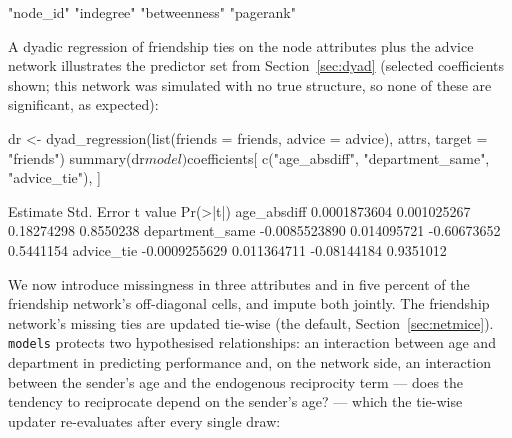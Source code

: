 \documentclass[11pt,a4paper]{article}
\newcommand{\code}[1]{\texttt{#1}}
\begin{document}
\begin{Routput}
[1] "node_id"     "indegree"    "betweenness" "pagerank"
\end{Routput}

A dyadic regression of friendship ties on the node attributes plus the
advice network illustrates the predictor set from
Section~\ref{sec:dyad} (selected coefficients shown; this network was
simulated with no true structure, so none of these are significant, as
expected):

\begin{Rinput}
dr <- dyad_regression(list(friends = friends, advice = advice),
                       attrs, target = "friends")
summary(dr$model)$coefficients[
  c("age_absdiff", "department_same", "advice_tie"), ]
\end{Rinput}

\begin{Routput}
                     Estimate  Std. Error     t value  Pr(>|t|)
age_absdiff      0.0001873604 0.001025267  0.18274298 0.8550238
department_same -0.0085523890 0.014095721 -0.60673652 0.5441154
advice_tie      -0.0009255629 0.011364711 -0.08144184 0.9351012
\end{Routput}

We now introduce missingness in three attributes and in five percent of the
friendship network's off-diagonal cells, and impute both jointly. The
friendship network's missing ties are updated tie-wise (the default,
Section~\ref{sec:netmice}). \code{models} protects two hypothesised
relationships: an interaction between age and department in predicting
performance and, on the network side, an interaction between the sender's
age and the endogenous reciprocity term --- does the tendency to
reciprocate depend on the sender's age? --- which the tie-wise updater
re-evaluates after every single draw:

\end{document}
